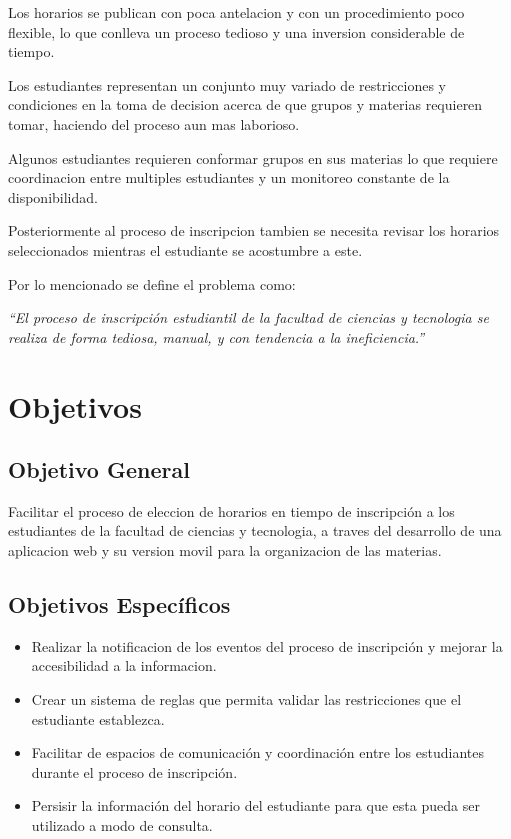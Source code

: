 \documentclass[letterpaper,11pt]{article}
\begin{document}
Los horarios se publican con poca antelacion y con un procedimiento poco
flexible, lo que conlleva un proceso tedioso y una inversion considerable de
tiempo.

Los estudiantes representan un conjunto muy variado de restricciones y
condiciones en la toma de decision acerca de que grupos y materias requieren
tomar, haciendo del proceso aun mas laborioso.

Algunos estudiantes requieren conformar grupos en sus materias lo que
requiere coordinacion entre multiples estudiantes y un monitoreo constante de la
disponibilidad.

Posteriormente al proceso de inscripcion tambien se necesita revisar los
horarios seleccionados mientras el estudiante se acostumbre a este.

Por lo mencionado se define el problema como:

\emph{“El proceso de inscripción estudiantil de la facultad de ciencias y 
tecnologia se realiza de forma tediosa, manual, y con tendencia a la
ineficiencia.”}

\section{Objetivos}

\subsection{Objetivo General}
Facilitar el proceso de eleccion de horarios en tiempo de inscripción a los
estudiantes de la facultad de ciencias y tecnologia, a traves del desarrollo de
una aplicacion web y su version movil para la organizacion de las materias.

\subsection{Objetivos Específicos}
\begin{itemize}
\item Realizar la notificacion de los eventos del proceso de inscripción y
    mejorar la accesibilidad a la informacion.
\item Crear un sistema de reglas que permita validar las restricciones que el
    estudiante establezca.
\item Facilitar de espacios de comunicación y coordinación entre los estudiantes
    durante el proceso de inscripción.
\item Persisir la información del horario del estudiante para que esta pueda ser
    utilizado a modo de consulta.
\end{itemize}
\end{document}
